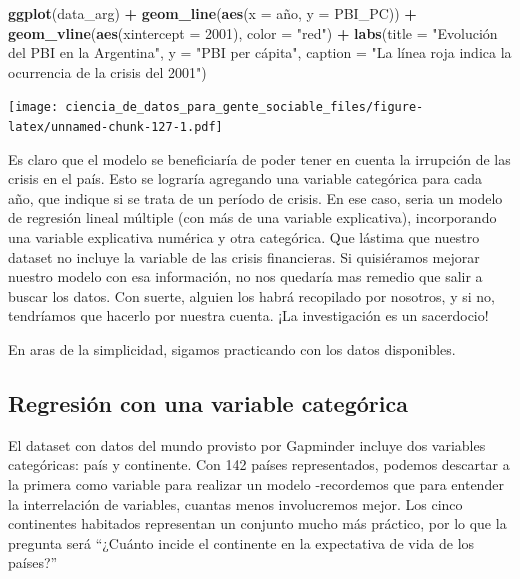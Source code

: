 \documentclass[spanish,]{book}
\newenvironment{Shaded}{\begin{snugshade}}{\end{snugshade}}
\newcommand{\DataTypeTok}[1]{\textcolor[rgb]{0.13,0.29,0.53}{#1}}
\newcommand{\DecValTok}[1]{\textcolor[rgb]{0.00,0.00,0.81}{#1}}
\newcommand{\KeywordTok}[1]{\textcolor[rgb]{0.13,0.29,0.53}{\textbf{#1}}}
\newcommand{\NormalTok}[1]{#1}
\newcommand{\OperatorTok}[1]{\textcolor[rgb]{0.81,0.36,0.00}{\textbf{#1}}}
\newcommand{\StringTok}[1]{\textcolor[rgb]{0.31,0.60,0.02}{#1}}
\begin{document}
\begin{Shaded}
\begin{Highlighting}[]
\KeywordTok{ggplot}\NormalTok{(data_arg) }\OperatorTok{+}\StringTok{ }
\StringTok{    }\KeywordTok{geom_line}\NormalTok{(}\KeywordTok{aes}\NormalTok{(}\DataTypeTok{x =}\NormalTok{ año, }\DataTypeTok{y =}\NormalTok{ PBI_PC)) }\OperatorTok{+}
\StringTok{    }\KeywordTok{geom_vline}\NormalTok{(}\KeywordTok{aes}\NormalTok{(}\DataTypeTok{xintercept =} \DecValTok{2001}\NormalTok{), }\DataTypeTok{color =} \StringTok{"red"}\NormalTok{) }\OperatorTok{+}
\StringTok{    }\KeywordTok{labs}\NormalTok{(}\DataTypeTok{title =} \StringTok{"Evolución del PBI en la Argentina"}\NormalTok{,}
         \DataTypeTok{y =} \StringTok{"PBI per cápita"}\NormalTok{,}
         \DataTypeTok{caption =} \StringTok{"La línea roja indica la ocurrencia de la crisis del 2001"}\NormalTok{)}
\end{Highlighting}
\end{Shaded}

\texttt{[image: ciencia\_de\_datos\_para\_gente\_sociable\_files/figure-latex/unnamed-chunk-127-1.pdf]}

Es claro que el modelo se beneficiaría de poder tener en cuenta la irrupción de las crisis en el país. Esto se lograría agregando una variable categórica para cada año, que indique si se trata de un período de crisis. En ese caso, seria un modelo de regresión lineal múltiple (con más de una variable explicativa), incorporando una variable explicativa numérica y otra categórica. Que lástima que nuestro dataset no incluye la variable de las crisis financieras. Si quisiéramos mejorar nuestro modelo con esa información, no nos quedaría mas remedio que salir a buscar los datos. Con suerte, alguien los habrá recopilado por nosotros, y si no, tendríamos que hacerlo por nuestra cuenta. ¡La investigación es un sacerdocio!

En aras de la simplicidad, sigamos practicando con los datos disponibles.

\hypertarget{regresion-con-una-variable-categorica}{%
\subsection{Regresión con una variable categórica}\label{regresion-con-una-variable-categorica}}

El dataset con datos del mundo provisto por Gapminder incluye dos variables categóricas: país y continente. Con 142 países representados, podemos descartar a la primera como variable para realizar un modelo -recordemos que para entender la interrelación de variables, cuantas menos involucremos mejor. Los cinco continentes habitados representan un conjunto mucho más práctico, por lo que la pregunta será ``¿Cuánto incide el continente en la expectativa de vida de los países?''
\end{document}

